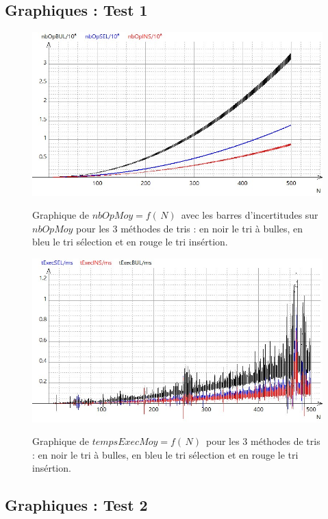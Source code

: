 \documentclass{report}
\begin{document}
\subsection{Graphiques : Test 1}

\begin{figure}[H]
	\includegraphics[width=\textwidth]{../graphe/nbOp.jpg}
	\label{nbOP1}
	\caption{Graphique de $nbOpMoy=f(\,N)\,$ avec les barres d'incertitudes sur $nbOpMoy$ pour les 3 méthodes de tris : en noir le tri à bulles, en bleu le tri sélection et en rouge le tri insértion.}
\end{figure}
\begin{figure}[H]
	\includegraphics[width=\textwidth]{../graphe/tExecAvecU.jpg}
	\label{tExec1}
	\caption{Graphique de $tempsExecMoy=f(\,N)\,$ pour les 3 méthodes de tris : en noir le tri à bulles, en bleu le tri sélection et en rouge le tri insértion.}
\end{figure}

\subsection{Graphiques : Test 2}
\end{document}
